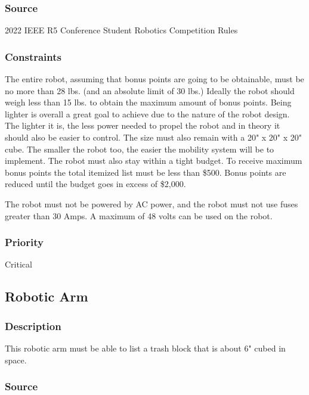 \subsubsection{Source}

2022 IEEE R5 Conference Student Robotics Competition Rules

\subsubsection{Constraints}

The entire robot, assuming that bonus points are going to be obtainable, must be no more than 28 lbs. (and an absolute limit of 30 lbs.) Ideally the robot should weigh less than 15 lbs. to obtain the maximum amount of bonus points. Being lighter is overall a great goal to achieve due to the nature of the robot design. The lighter it is, the less power needed to propel the robot and in theory it should also be easier to control. The size must also remain with a 20" x 20" x 20" cube. The smaller the robot too, the easier the mobility system will be to implement. The robot must also stay within a tight budget. To receive maximum bonus points the total itemized list must be less than \$500. Bonus points are reduced until the budget goes in excess of \$2,000.


The robot must not be powered by AC power, and the robot must not use fuses greater than 30 Amps. A maximum of 48 volts can be used on the robot.

\subsubsection{Priority}

Critical


\subsection{Robotic Arm}

\subsubsection{Description}

This robotic arm must be able to list a trash block that is about 6" cubed in space.

\subsubsection{Source}

